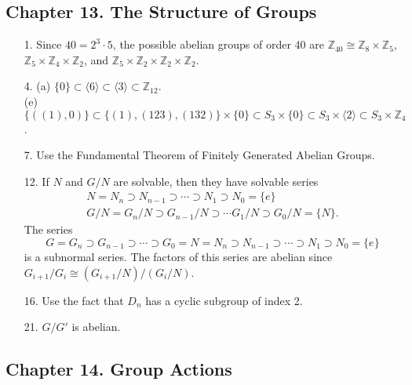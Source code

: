 \subsection*{Chapter 13. The Structure of Groups}
 
{\small
\begin{itemize}
 
\item[1.] 
Since $40 = 2^3 \cdot 5$, the possible abelian groups of order 40 are 
${\mathbb Z}_{40} \cong {\mathbb Z}_{8} \times {\mathbb Z}_{5}$, 
${\mathbb Z}_{5} \times {\mathbb Z}_{4} \times {\mathbb Z}_{2}$, and
${\mathbb Z}_{5} \times {\mathbb Z}_{2} \times {\mathbb Z}_{2} \times {\mathbb
Z}_{2}$. 
 
\item[4.] 
(a) $\{ 0 \} \subset \langle 6 \rangle \subset \langle 3
\rangle \subset {\mathbb Z}_{12}$. \\
(e) 
$\{ ((1), 0)  \} \subset \{ (1), (123), (132) \} \times \{ 0 \}  
\subset S_3 \times \{ 0 \}  \subset 
S_3 \times \langle 2 \rangle \subset S_3 \times {\mathbb Z}_4$.
 
\item[7.]
Use the Fundamental Theorem of Finitely Generated Abelian Groups.
 
\item[12.]
If $N$ and $G/N$ are solvable, then they have solvable series
\[
\begin{array}{c}
N = N_n \supset N_{n-1} \supset \cdots \supset N_1 \supset N_0 
= \{ e \}  \\
G/N = G_n/N \supset G_{n-1}/N \supset \cdots G_1/N \supset G_0/N 
= \{ N \}.
\end{array}
\]
The series
\[
G = G_n \supset G_{n-1}	\supset \cdots \supset G_0 = N = N_n \supset
N_{n-1} \supset \cdots \supset N_1 \supset N_0 = \{ e \} 
\]
is a subnormal series. The factors of this series are abelian since
$G_{i+1}/G_i \cong (G_{i+1}/N)/(G_i/N)$.
 
\item[16.]
Use the fact that $D_n$ has a cyclic subgroup of index 2.
 
\item[21.]
$G/G'$ is abelian.
 
 
\end{itemize}
}
 
\subsection*{Chapter 14. Group Actions}
 
